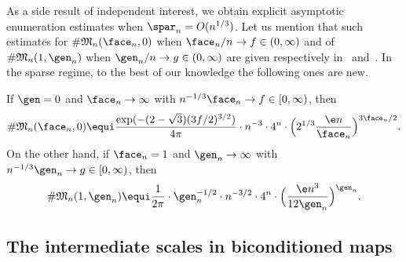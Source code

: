 As a side result of independent interest, we obtain explicit asymptotic enumeration estimates when $\spar_n= O(n^{1/3})$. Let us mention that such estimates for $\# \mathfrak{M}_{n}(\face_{n},0)$ when $\face_{n}/n \rightarrow f \in (0,\infty)$ and of $\# \mathfrak{M}_{n}(1,\gen_{n})$ when $\gen_{n}/n \rightarrow g \in (0,\infty)$ are given respectively in~\cite[Th.\,1]{BCR93} and~\cite[Th.\,3]{ACCR13}. In the sparse regime, to the best of our knowledge the following ones are new.

\begin{corollary}
\label{cor:enumeration}
If $\gen=0$ and $\face_n \to \infty$ with $n^{-1/3} \face_n \to f \in [0,\infty)$, then
\[
\# \mathfrak{M}_n(\face_n,0)
\equi \frac{\exp(-(2-\sqrt{3}) (3f/2)^{3/2})}{4 \pi} \cdot n^{-3} \cdot 4^{n} \cdot \Bigl(2^{1/3} \frac{\e n}{\face_{n}}\Bigr)^{3\face_{n}/2}.
\]
On the other hand, if $\face_n=1$ and $\gen_n \to \infty$ with $n^{-1/3} \gen_n \to g \in [0,\infty)$, then
\[
\# \mathfrak{M}_n(1,\gen_n)
\equi \frac{1}{2\pi } \cdot \gen_n^{-1/2} \cdot n^{-3/2} \cdot 4^{n} \cdot \Bigl(\frac{\e n^3}{12 \gen_n}\Bigr)^{\gen_n}.
\]
\end{corollary}

\subsection{The intermediate scales in biconditioned maps}

